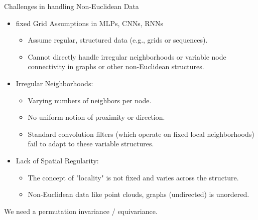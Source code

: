 \documentclass[aspectratio=169,xcolor=dvipsnames,svgnames,x11names,fleqn]{beamer}
\begin{document}
\begin{frame}{Challenges in handling Non-Euclidean Data}

\footnotesize

\begin{itemize}
\item fixed Grid Assumptions in MLPs, CNNs, RNNs
\begin{itemize}
\item Assume regular, structured data (e.g., grids or
sequences).
\item Cannot directly handle irregular neighborhoods or
variable node connectivity in graphs or other
non-Euclidean structures.
\end{itemize}
\item Irregular Neighborhoods:
\begin{itemize}
\item Varying numbers of neighbors per node.
\item No uniform notion of proximity or direction.
\item Standard convolution filters (which operate on fixed local
neighborhoods) fail to adapt to these variable structures.
\end{itemize}
\item Lack of Spatial Regularity:

\begin{itemize}
\item The concept of "locality" is not fixed and varies across the
structure.
\item Non-Euclidean data like point clouds, graphs (undirected)
is unordered.
\end{itemize}
\end{itemize}

\begin{center}
We need a permutation invariance / equivariance.
\end{center}

\end{frame}
\end{document}
